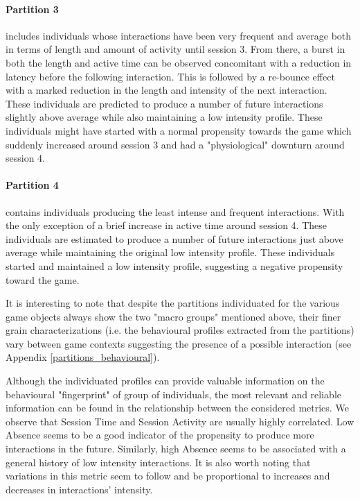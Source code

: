 \paragraph*{\textbf{Partition 3}} includes individuals whose interactions have been very frequent and average both in terms of length and amount of activity until session 3. From there, a burst in both the length and active time can be observed concomitant with a reduction in latency before the following interaction. This is followed by a re-bounce effect with a marked reduction in the length and intensity of the next interaction. These individuals are predicted to produce a number of future interactions slightly above average while also maintaining a low intensity profile. These individuals might have started with a normal propensity towards the game which suddenly increased around session 3 and had a "physiological" downturn around session 4. 

\paragraph*{\textbf{Partition 4}} contains individuals producing the least intense and frequent interactions. With the only exception of a brief increase in active time around session 4. These individuals are estimated to produce a number of future interactions just above average while maintaining the original low intensity profile. These individuals started and maintained a low intensity profile, suggesting a negative propensity toward the game. 

It is interesting to note that despite the partitions individuated for the various game objects always show the two "macro groups" mentioned above, their finer grain characterizations (i.e. the behavioural profiles extracted from the partitions) vary between game contexts suggesting the presence of a possible interaction (see Appendix \ref{partitions_behavioural}).

Although the individuated profiles can provide valuable information on the behavioural "fingerprint" of group of individuals, the most relevant and reliable information can be found in the relationship between the considered metrics. We observe that Session Time and Session Activity are usually highly correlated. Low Absence seems to be a good indicator of the propensity to produce more interactions in the future. Similarly, high Absence seems to be associated with a general history of low intensity interactions. It is also worth noting that variations in this metric seem to follow and be proportional to increases and decreases in interactions' intensity. 

